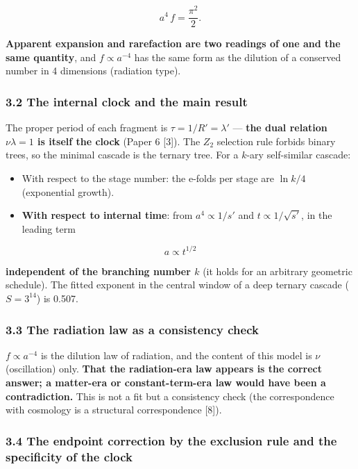 \documentclass[
]{ltjsarticle}
\providecommand{\tightlist}{%
  \setlength{\itemsep}{0pt}\setlength{\parskip}{0pt}}
\begin{document}
\[
a^4\,f=\frac{\pi^2}{2}.
\]

\textbf{Apparent expansion and rarefaction are two readings of one and
the same quantity}, and \(f\propto a^{-4}\) has the same form as the
dilution of a conserved number in 4 dimensions (radiation type).

\subsubsection{3.2 The internal clock and the main
result}\label{the-internal-clock-and-the-main-result}

The proper period of each fragment is \(\tau=1/R'=\lambda'\) ---
\textbf{the dual relation \(\nu\lambda=1\) is itself the clock} (Paper 6
{[}3{]}). The \(Z_2\) selection rule forbids binary trees, so the
minimal cascade is the ternary tree. For a \(k\)-ary self-similar
cascade:

\begin{itemize}
\tightlist
\item
  With respect to the stage number: the e-folds per stage are
  \(\ln k/4\) (exponential growth).
\item
  \textbf{With respect to internal time}: from \(a^4\propto1/s'\) and
  \(t\propto1/\sqrt{s'}\), in the leading term
\end{itemize}

\[
\boxed{\;a\propto t^{1/2}\;}
\]

\textbf{independent of the branching number \(k\)} (it holds for an
arbitrary geometric schedule). The fitted exponent in the central window
of a deep ternary cascade (\(S=3^{14}\)) is 0.507.

\subsubsection{3.3 The radiation law as a consistency
check}\label{the-radiation-law-as-a-consistency-check}

\(f\propto a^{-4}\) is the dilution law of radiation, and the content of
this model is \(\nu\) (oscillation) only. \textbf{That the radiation-era
law appears is the correct answer; a matter-era or constant-term-era law
would have been a contradiction.} This is not a fit but a consistency
check (the correspondence with cosmology is a structural correspondence
{[}8{]}).

\subsubsection{3.4 The endpoint correction by the exclusion rule and the
specificity of the
clock}\label{the-endpoint-correction-by-the-exclusion-rule-and-the-specificity-of-the-clock}
\end{document}
